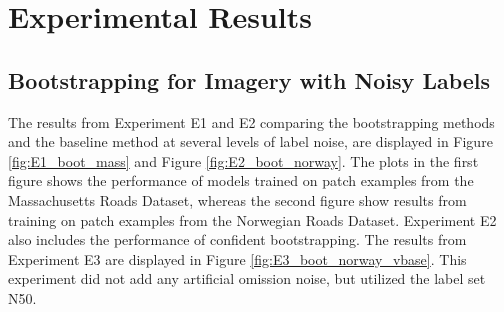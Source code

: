 \section{Experimental Results}
\label{sec:experimentalResults}
\subsection{Bootstrapping for Imagery with Noisy Labels}
\label{sec:results_bootstrapping}
The results from Experiment E1 and E2 comparing the bootstrapping methods and the baseline method at several levels of label noise, are displayed in Figure \ref{fig:E1_boot_mass} and Figure \ref{fig:E2_boot_norway}. The plots in the first figure shows the performance of models trained on patch examples from the Massachusetts Roads Dataset, whereas the second figure show results from training on patch examples from the Norwegian Roads Dataset. Experiment E2 also includes the performance of confident bootstrapping. The results from Experiment E3 are displayed in Figure \ref{fig:E3_boot_norway_vbase}. This experiment did not add any artificial omission noise, but utilized the label set N50.\\

